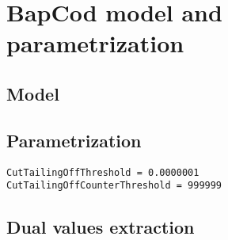 \chapter{BapCod model and parametrization}


\section{Model}



\section{Parametrization}

\begin{verbatim}
CutTailingOffThreshold = 0.0000001
CutTailingOffCounterThreshold = 999999
\end{verbatim}

\section{Dual values extraction}
